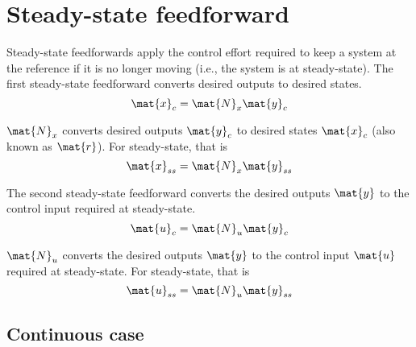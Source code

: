 \section{Steady-state feedforward}

Steady-state feedforwards apply the \gls{control effort} required to keep a
\gls{system} at the \gls{reference} if it is no longer moving (i.e., the
\gls{system} is at steady-state). The first steady-state feedforward converts
desired \glspl{output} to desired \glspl{state}.
\begin{equation*}
  \mat{x}_c = \mat{N}_x\mat{y}_c
\end{equation*}

$\mat{N}_x$ converts desired \glspl{output} $\mat{y}_c$ to desired \glspl{state}
$\mat{x}_c$ (also known as $\mat{r}$). For steady-state, that is
\begin{equation}
  \mat{x}_{ss} = \mat{N}_x\mat{y}_{ss} \label{eq:x_ss}
\end{equation}

The second steady-state feedforward converts the desired \glspl{output}
$\mat{y}$ to the \gls{control input} required at steady-state.
\begin{equation*}
  \mat{u}_c = \mat{N}_u\mat{y}_c
\end{equation*}

$\mat{N}_u$ converts the desired \glspl{output} $\mat{y}$ to the
\gls{control input} $\mat{u}$ required at steady-state. For steady-state, that
is
\begin{equation}
  \mat{u}_{ss} = \mat{N}_u\mat{y}_{ss} \label{eq:u_ss}
\end{equation}

\subsection{Continuous case}

